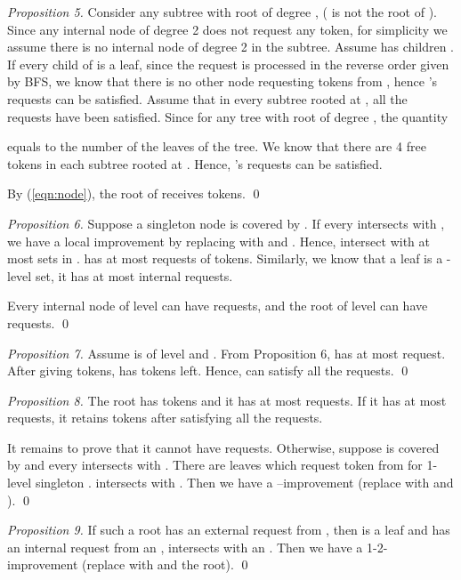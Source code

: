 \documentclass[runningheads,a4paper]{llncs}
\numberwithin{equation}{section}
\begin{document}
\begin{proof}[Proposition 5]
Consider any subtree with root  of degree ,  ( is not the root of ). Since any internal node of degree 2 does not request any token, for simplicity we assume there is no internal node of degree 2 in the subtree. Assume  has children . If every child of  is a leaf, since the request is processed in the reverse order given by BFS, we know that there is no other node requesting tokens from , hence 's requests can be satisfied. Assume that in every subtree rooted at , all the requests have been satisfied. Since for any tree with root of degree , the quantity

equals to the number of the leaves of the tree. We know that there are 4 free tokens in each subtree rooted at . Hence, 's requests can be satisfied.

By (\ref{eqn:node}), the root of  receives  tokens. \qed
\end{proof}

\begin{proof}[Proposition 6]
Suppose a singleton node  is covered by . If every  intersects with , we have a local improvement by replacing  with  and . Hence,  intersect with at most  sets in .  has at most  requests of tokens. Similarly, we know that a leaf is a -level set, it has at most  internal requests.

Every internal node of level  can have  requests, and the root of level  can have  requests. \qed
\end{proof}


\begin{proof}[Proposition 7]
Assume  is of level  and . From Proposition 6,  has at most  request. After giving  tokens,  has  tokens left. Hence,  can satisfy all the requests. \qed
\end{proof}

\begin{proof}[Proposition 8]
The root has  tokens and it has at most  requests. If it has at most  requests, it retains  tokens after satisfying all the requests.

It remains to prove that it cannot have  requests. Otherwise, suppose  is covered by  and every  intersects with . There are leaves  which request token from  for 1-level singleton .  intersects with . Then we have a --improvement (replace  with  and ). \qed
\end{proof}

\begin{proof}[Proposition 9]
If such a root has an external request from , then  is a leaf and  has an internal request from an ,  intersects with an . Then we have a 1-2-improvement (replace  with  and the root). \qed
\end{proof}
\end{document}

